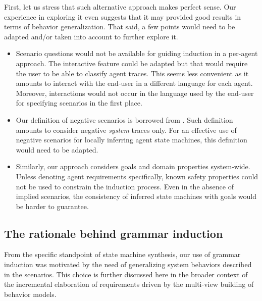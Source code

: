 First, let us stress that such alternative approach makes perfect sense. Our experience in exploring it even suggests that it may provided good results in terms of behavior generalization. That said, a few points would need to be adapted and/or taken into account to further explore it.
\begin{itemize}
\item Scenario questions would not be available for guiding induction in a per-agent approach. The interactive feature could be adapted but that would require the user to be able to classify agent traces. This seems less convenient as it amounts to interact with the end-user in a different language for each agent. Moreover, interactions would not occur in the language used by the end-user for specifying scenarios in the first place. 
\item Our definition of negative scenarios is borrowed from \cite{Uchitel:2002}. Such definition amounts to consider negative \emph{system} traces only. For an effective use of negative scenarios for locally inferring agent state machines, this definition would need to be adapted.
\item Similarly, our approach considers goals and domain properties system-wide. Unless denoting agent requirements specifically, known safety properties could not be used to constrain the induction process. Even in the absence of implied scenarios, the consistency of inferred state machines with goals would be harder to guarantee.
\end{itemize}

\subsection{The rationale behind grammar induction}

From the specific standpoint of state machine synthesis, our use of grammar induction was motivated by the need of generalizing system behaviors described in the scenarios. This choice is further discussed here in the broader context of the incremental elaboration of requirements driven by the multi-view building of behavior models.

